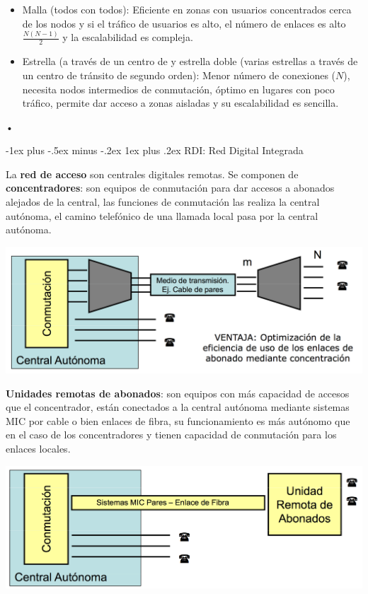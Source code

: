 \documentclass[10pt,portrait, twocolumn]{article}
\makeatletter
\renewcommand{\subsubsection}{\@startsection{subsubsection}{3}{0mm}%
                                {-1ex plus -.5ex minus -.2ex}%
                                {1ex plus .2ex}%
                                {\normalfont\small\bfseries}}
\makeatother
\begin{document}
	\begin{itemize}
		\item Malla (todos con todos): Eficiente en zonas con usuarios concentrados cerca de los nodos y si el tráfico de usuarios es alto, el número de enlaces es alto $\frac{N(N-1)}{2}$ y la escalabilidad es compleja.
		\item Estrella (a través de un centro de y estrella doble (varias estrellas a través de un centro de tránsito de segundo orden): Menor número de conexiones ($N$), necesita nodos intermedios de conmutación, óptimo en lugares con poco tráfico, permite dar acceso a zonas aisladas y su escalabilidad es sencilla.
	\end{itemize}•

\subsubsection{RDI: Red Digital Integrada}

La \textbf{red de acceso} son centrales digitales remotas. Se componen de \textbf{concentradores}: son equipos de conmutación para dar accesos a abonados alejados de la central, las funciones de conmutación las realiza la central autónoma, el camino telefónico de una llamada local pasa por la central autónoma.

	\begin{center}
		\includegraphics[scale=0.2]{images/RedAcceso}
	\end{center}

\textbf{Unidades remotas de abonados}: son equipos con más capacidad de accesos que el concentrador, están conectados a la central autónoma mediante sistemas MIC por cable o bien enlaces de fibra, su funcionamiento es más autónomo que en el caso de los concentradores y tienen capacidad de conmutación para los enlaces locales.

	\begin{center}
		\includegraphics[scale=0.2]{images/RDI}
	\end{center}
		
\end{document}
